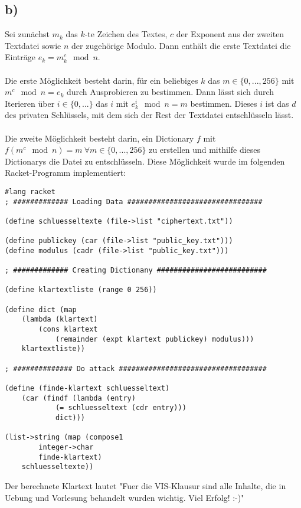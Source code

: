 \documentclass[ngerman]{fbi-aufgabenblatt}
\begin{document}
	\subsection*{b)}
	Sei zunächst $m_k$ das $k$-te Zeichen des Textes, $c$ der Exponent aus der zweiten Textdatei sowie $n$ der zugehörige Modulo. Dann enthält die erste Textdatei die Einträge $e_k = m_k^c \mod n$. \\
	\\
	Die erste Möglichkeit besteht darin, für ein beliebiges $k$ das $m\in\{0,...,256\}$ mit $m^c\mod n=e_k$ durch Ausprobieren zu bestimmen. Dann lässt sich durch Iterieren über $i\in\{0,...\}$ das $i$ mit $e_k^i \mod n = m$ bestimmen. Dieses $i$ ist das $d$ des privaten Schlüssels, mit dem sich der Rest der Textdatei entschlüsseln lässt. \\
	\\
	Die zweite Möglichkeit besteht darin, ein Dictionary $f$ mit $f(m^c \mod n) = m\ \forall m\in \{0,...,256\}$ zu erstellen und mithilfe dieses Dictionarys die Datei zu entschlüsseln. Diese Möglichkeit wurde im folgenden Racket-Programm implementiert:
	\begin{lstlisting}[style=Racket]
#lang racket
; ############# Loading Data ################################
	
(define schluesseltexte (file->list "ciphertext.txt"))

(define publickey (car (file->list "public_key.txt")))
(define modulus (cadr (file->list "public_key.txt")))

; ############# Creating Dictionany ##########################

(define klartextliste (range 0 256))

(define dict (map
	(lambda (klartext)
		(cons klartext
			(remainder (expt klartext publickey) modulus)))
	klartextliste))

; ############## Do attack ###################################

(define (finde-klartext schluesseltext)
	(car (findf (lambda (entry)
			(= schluesseltext (cdr entry)))
			dict)))

(list->string (map (compose1
		integer->char
		finde-klartext)
	schluesseltexte))
	\end{lstlisting}
Der berechnete Klartext lautet "Fuer die VIS-Klausur sind alle Inhalte, die in Uebung und Vorlesung behandelt wurden wichtig. Viel Erfolg! :-)"
	
\end{document}
